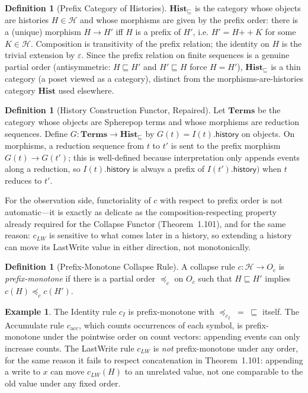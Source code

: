 \documentclass[12pt, a4paper, openany]{book}
\theoremstyle{plain}
\theoremstyle{definition}
\newtheorem{definition}[theorem]{Definition}
\newtheorem{example}[theorem]{Example}
\theoremstyle{remark}
\newcommand{\Hist}{\mathbf{Hist}}
\newcommand{\calH}{\mathcal{H}}
\begin{document}
\begin{definition}[Prefix Category of Histories]
$\Hist_\sqsubseteq$ is the category whose objects are histories $H \in \calH$
and whose morphisms are given by the prefix order: there is a (unique) morphism
$H \to H'$ iff $H$ is a prefix of $H'$, i.e. $H' = H \mathbin{++} K$ for some
$K \in \calH$. Composition is transitivity of the prefix relation; the identity
on $H$ is the trivial extension by $\varepsilon$. Since the prefix relation on
finite sequences is a genuine partial order (antisymmetric: $H \sqsubseteq H'$
and $H' \sqsubseteq H$ force $H = H'$), $\Hist_\sqsubseteq$ is a thin category
(a poset viewed as a category), distinct from the morphisms-are-histories
category $\Hist$ used elsewhere.
\end{definition}

\begin{definition}[History Construction Functor, Repaired]
Let $\mathbf{Terms}$ be the category whose objects are Spherepop terms and whose
morphisms are reduction sequences. Define $G : \mathbf{Terms} \to \Hist_\sqsubseteq$
by $G(t) = I(t).\mathsf{history}$ on objects. On morphisms, a reduction sequence
from $t$ to $t'$ is sent to the prefix morphism $G(t) \to G(t')$; this is
well-defined because interpretation only appends events along a reduction, so
$I(t).\mathsf{history}$ is always a prefix of $I(t').\mathsf{history})$ when $t$
reduces to $t'$.
\end{definition}

For the observation side, functoriality of $c$ with respect to prefix order is
not automatic---it is exactly as delicate as the composition-respecting
property already required for the Collapse Functor (Theorem~1.101), and for the
same reason: $c_{LW}$ is sensitive to what comes later in a history, so
extending a history can move its LastWrite value in either direction, not
monotonically.

\begin{definition}[Prefix-Monotone Collapse Rule]
A collapse rule $c : \calH \to O_c$ is \emph{prefix-monotone} if there is a
partial order $\preceq_c$ on $O_c$ such that $H \sqsubseteq H'$ implies
$c(H) \preceq_c c(H')$.
\end{definition}

\begin{example}
The Identity rule $c_I$ is prefix-monotone with $\preceq_{c_I} \;=\; \sqsubseteq$
itself. The Accumulate rule $c_{\mathrm{acc}}$, which counts occurrences of each
symbol, is prefix-monotone under the pointwise order on count vectors: appending
events can only increase counts. The LastWrite rule $c_{LW}$ is \emph{not}
prefix-monotone under any order, for the same reason it fails to respect
concatenation in Theorem~1.101: appending a write to $x$ can move $c_{LW}(H)$ to
an unrelated value, not one comparable to the old value under any fixed order.
\end{example}
\end{document}
